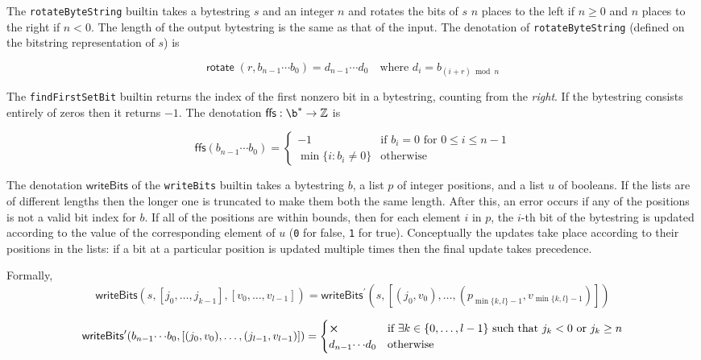 \label{note:rotate}
The \texttt{rotateByteString} builtin takes a bytestring $s$ and an integer $n$
and rotates the bits of $s$ $n$ places to the left if $n \geq 0$ and $n$ places
to the right if $n < 0$.  The length of the output bytestring is the same as
that of the input.  The denotation of
\texttt{rotateByteString} (defined on the bitstring representation of $s$) is 

$$
\mathsf{rotate}\;(r, b_{n-1} \cdots b_0) = d_{n-1}\cdots d_0 \quad\text{where $d_i = b_{(i+r)\bmod n}$}
$$

\label{note:ffs}

The \texttt{findFirstSetBit} builtin returns the index of the first nonzero bit
in a bytestring, counting from the \textit{right}. If the bytestring consists
entirely of zeros then it returns $-1$.  The denotation
$\mathsf{ffs}: \b^* \rightarrow \Z$ is

$$
\mathsf{ffs}(b_{n-1}\cdots b_0) =
\begin{cases}
  -1 & \text{if $b_i = 0$ for $0 \leq i \leq n-1$}\\
  \min{\{i: b_i \ne 0\}} & \text{otherwise}
  \end{cases}
$$


\label{note:writebits}

The denotation $\mathsf{writeBits}$ of the \texttt{writeBits} builtin takes a
bytestring $b$, a list $p$ of integer positions, and a list $u$ of booleans.  If
the lists are of different lengths then the longer one is truncated to make them
both the same length.  After this, an error occurs if any of the positions is
not a valid bit index for $b$.  If all of the positions are within bounds, then
for each element $i$ in $p$, the $i$-th bit of the bytestring is updated
according to the value of the corresponding element of $u$ (\texttt{0}
for \textsf{false}, \texttt{1} for \textsf{true}).  Conceptually the updates
take place according to their positions in the lists: if a bit at a particular
position is updated multiple times then the final update takes precedence.

\smallskip
\noindent Formally, 
$$
\mathsf{writeBits}(s, [j_0 , \ldots, j_{k-1}], [v_0, \ldots, v_{l-1}]) =
    \mathsf{writeBits}^{\prime} (s, [(j_0, v_0) , \ldots, (p_{\min\{k,l\}-1}, v_{\min\{k,l\}-1})])
$$

$$
\mathsf{writeBits}^{\prime}(b_{n-1}{\cdots}b_0, [(j_0,v_0), \ldots, (j_{l-1}, v_{l-1})]) = 
\begin{cases}
\errorX & \text{if $\exists k \in \{0, \ldots, l-1\}$ such that $j_k<0$ or $j_k \geq n$} \\
d_{n-1}{\cdots}d_0 & \text{otherwise}
\end{cases}
$$

